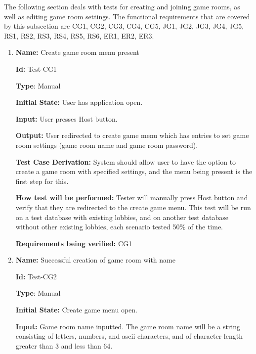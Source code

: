 \documentclass[12pt, titlepage]{article}
\begin{document}
		
The following section deals with tests for creating and joining game rooms, as well as editing game room settings. The functional requirements that are covered by this subsection are CG1, CG2, CG3, CG4, CG5, JG1, JG2, JG3, JG4, JG5, RS1, RS2, RS3, RS4, RS5, RS6, ER1, ER2, ER3.

\begin{enumerate}

\item{\textbf{Name:} Create game room menu present} \label{itm:Test-CG1}

\textbf{Id:} Test-CG1

\textbf{Type}: Manual

\textbf{Initial State:} User has application open.

\textbf{Input:} User presses Host button.

\textbf{Output:} User redirected to create game menu which has entries to set game room settings (game room name and game room password).

\textbf{Test Case Derivation:} System should allow user to have the option to create a game room with specified settings, and the menu being present is the first step for this.

\textbf{How test will be performed:} Tester will manually press Host button and verify that they are redirected to the create game menu. This test will be run on a test database with existing lobbies, and on another test database without other existing lobbies, each scenario tested 50\% of the time.

\textbf{Requirements being verified:}  CG1

\item{\textbf{Name:} Successful creation of game room with name}
\label{itm:Test-CG2}

\textbf{Id:} Test-CG2

\textbf{Type}: Manual

\textbf{Initial State:} Create game menu open.

\textbf{Input:} Game room name inputted. The game room name will be a string consisting of letters, numbers, and ascii characters, and of character length greater than 3 and less than 64. 


\end{enumerate}
\end{document}
